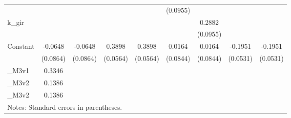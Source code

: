 \begin{table}[htbp]
\begin{tabular}{l*{8}{c}}
                         &                   &                   &                   &                   &  (0.0955)         &                   &                   &                   \\
[1em]
k\_gir                    &                   &                   &                   &                   &                   &    0.2882\sym{***}&                   &                   \\
                         &                   &                   &                   &                   &                   &  (0.0955)         &                   &                   \\
[1em]
Constant                 &   -0.0648         &   -0.0648         &    0.3898\sym{***}&    0.3898\sym{***}&    0.0164         &    0.0164         &   -0.1951\sym{***}&   -0.1951\sym{***}\\
                         &  (0.0864)         &  (0.0864)         &  (0.0564)         &  (0.0564)         &  (0.0844)         &  (0.0844)         &  (0.0531)         &  (0.0531)         \\
\hline
\_M3v1                    &    0.3346         &                   &                   &                   &                   &                   &                   &                   \\
\_M3v2                    &    0.1386         &                   &                   &                   &                   &                   &                   &                   \\
\_M3v2                    &    0.1386         &                   &                   &                   &                   &                   &                   &                   \\
\hline\hline
\multicolumn{9}{l}{\footnotesize Notes: Standard errors in parentheses.}\\
\end{tabular}
\end{table}
